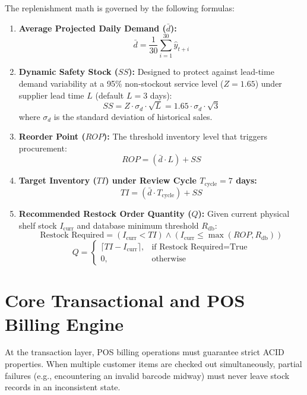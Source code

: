 The replenishment math is governed by the following formulas:
\begin{enumerate}
    \item \textbf{Average Projected Daily Demand ($\bar{d}$):}
    \begin{equation}
    \bar{d} = \frac{1}{30}\sum_{i=1}^{30}\hat{y}_{t+i}
    \end{equation}
    \item \textbf{Dynamic Safety Stock ($SS$):} Designed to protect against lead-time demand variability at a 95\% non-stockout service level ($Z = 1.65$) under supplier lead time $L$ (default $L = 3$ days):
    \begin{equation}
    SS = Z \cdot \sigma_d \cdot \sqrt{L} = 1.65 \cdot \sigma_d \cdot \sqrt{3}
    \end{equation}
    where $\sigma_d$ is the standard deviation of historical sales.
    \item \textbf{Reorder Point ($ROP$):} The threshold inventory level that triggers procurement:
    \begin{equation}
    ROP = (\bar{d} \cdot L) + SS
    \end{equation}
    \item \textbf{Target Inventory ($TI$) under Review Cycle $T_{\text{cycle}} = 7$ days:}
    \begin{equation}
    TI = (\bar{d} \cdot T_{\text{cycle}}) + SS
    \end{equation}
    \item \textbf{Recommended Restock Order Quantity ($Q$):} Given current physical shelf stock $I_{\text{curr}}$ and database minimum threshold $R_{\text{db}}$:
    \begin{equation}
    \text{Restock Required} = (I_{\text{curr}} < TI) \land (I_{\text{curr}} \le \max(ROP, R_{\text{db}}))
    \end{equation}
    \begin{equation}
    Q = \begin{cases} \lceil TI - I_{\text{curr}} \rceil, & \text{if Restock Required} = \text{True} \\ 0, & \text{otherwise} \end{cases}
    \end{equation}
\end{enumerate}

\section{Core Transactional and POS Billing Engine}
At the transaction layer, POS billing operations must guarantee strict ACID properties. When multiple customer items are checked out simultaneously, partial failures (e.g., encountering an invalid barcode midway) must never leave stock records in an inconsistent state.

